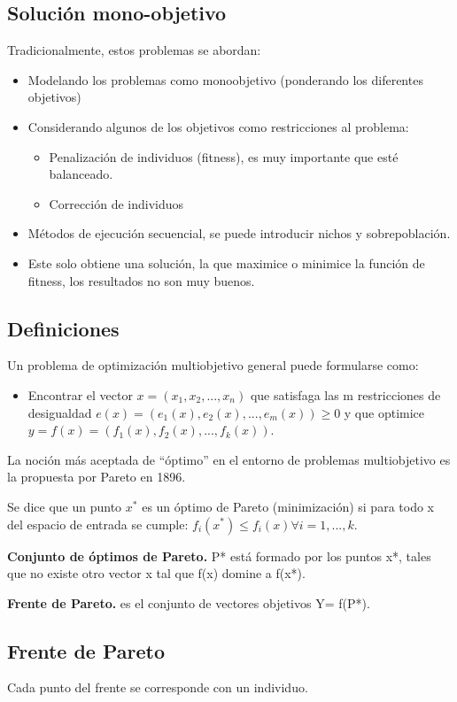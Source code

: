 \documentclass[12pt, twoside, openright]{report} %
\begin{document}
\subsection{Solución mono-objetivo}
Tradicionalmente, estos problemas se abordan:
\begin{itemize}
	\item Modelando los problemas como monoobjetivo (ponderando los diferentes objetivos)
	\item Considerando algunos de los objetivos como restricciones al problema:
	\begin{itemize}
		\item Penalización de individuos (fitness), es muy importante que esté balanceado.
		\item Corrección de individuos
	\end{itemize}
	\item Métodos de ejecución secuencial, se puede introducir nichos y sobrepoblación.
	\item Este solo obtiene una solución, la que maximice o minimice la función de fitness, los resultados no son muy buenos.
\end{itemize}

\subsection{Definiciones}
Un problema de optimización multiobjetivo general puede formularse como: 
\begin{itemize}
	\item Encontrar el vector $x = (x_1, x_2, ..., x_n)$ que satisfaga las m restricciones de desigualdad $e(x) = (e_1(x), e_2(x), ..., e_m(x)) \geq 0$ y que optimice $y = f (x) = (f_1(x), f_2(x), ..., f_k(x))$.
\end{itemize}

La noción más aceptada de \enquote{óptimo} en el entorno de problemas multiobjetivo es la propuesta por Pareto en 1896.

Se dice que un punto $x^*$ es un óptimo de Pareto (minimización) si para todo x del espacio de entrada se cumple: $f_i(x^*) \leq f_i(x) \forall i = 1, ..., k$.

\textbf{Conjunto de óptimos de Pareto.} P* está formado por los puntos x*, tales que no existe otro vector x tal que f(x) domine a f(x*).

\textbf{Frente de Pareto.} es el conjunto de vectores objetivos Y= f(P*).

\subsection{Frente de Pareto}
Cada punto del frente se corresponde con un individuo.
\end{document}
